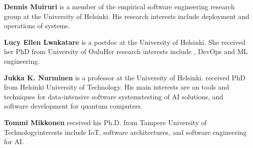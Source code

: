 \textbf{Dennis Muiruri} is a member of the empirical software engineering research group at the University of Helsinki. His \DIFdelbegin {}\DIFdelend research interests include deployment and operations of \DIFdelbegin {}\DIFdelend \DIFaddbegin {}\DIFaddend systems.

\textbf{Lucy Ellen Lwakatare} is a postdoc at the University of Helsinki. She received her PhD from University of Oulu\DIFdelbegin {}\DIFdelend \DIFaddbegin {}\DIFaddend Her research interests include \DIFdelbegin {}\DIFdelend \DIFaddbegin {}\DIFaddend , DevOps and ML engineering.

\textbf{Jukka K. Nurminen} is a professor at the University of Helsinki. 
\DIFdelbegin {}\DIFdelend %
\DIFaddbegin {}\DIFaddend received PhD from Helsinki University of Technology\DIFdelbegin {}\DIFdelend . His main interests are on tools and techniques for \DIFdelbegin {}\DIFdelend data-intensive software systems\DIFdelbegin {}\DIFdelend \DIFaddbegin \DIFadd{, }\DIFaddend testing of AI solutions, \DIFdelbegin {}\DIFdelend and software development for quantum computers.

\textbf{Tommi Mikkonen} \DIFaddbegin {}\DIFaddend received his Ph.D. from Tampere University of Technology\DIFdelbegin {}\DIFdelend \DIFaddbegin {}\DIFaddend interests include IoT, software architectures, and software engineering for AI.
